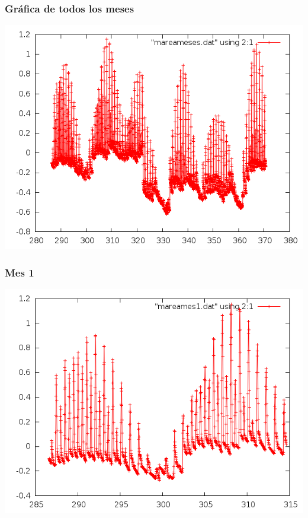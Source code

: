 \documentclass[10pt]{article}
\begin{document}
\subsubsection{Gráfica de todos los meses}
\includegraphics[scale=0.6]{mareameses.png}

\subsubsection{Mes 1}
\includegraphics[scale=0.6]{mareames1.png}
\end{document}
